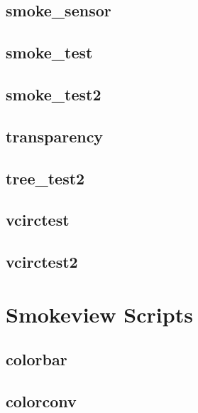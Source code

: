 \documentclass[11pt,twoside]{book}
\begin{document}
\section{smoke\_sensor}
\label{FDSsmokesensor}

\section{smoke\_test}
\label{FDSsmoketest}

\section{smoke\_test2}
\label{FDSsmoketest2}

\section{transparency}
\label{FDStransparency}

\section{tree\_test2}

\section{vcirctest}

\section{vcirctest2}

\chapter{Smokeview Scripts}
\label{smvscripts}

\section{colorbar}
\label{SSFcolorbar}

\section{colorconv}
\label{SSFcolorconv}
\end{document}
